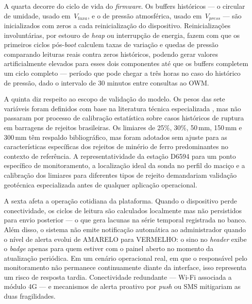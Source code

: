 A quarta decorre do ciclo de vida do \textit{firmware}. Os buffers
históricos --- o circular de umidade, usado em~$V_{taxa}$, e o de
pressão atmosférica, usado em~$V_{press}$ --- são inicializados com
zeros a cada reinicialização do dispositivo. Reinicializações
involuntárias, por estouro de \textit{heap} ou interrupção de energia,
fazem com que os primeiros ciclos pós-\textit{boot} calculem taxas de
variação e quedas de pressão comparando leituras reais contra zeros
históricos, podendo gerar valores artificialmente elevados para esses
dois componentes até que os buffers completem um ciclo completo ---
período que pode chegar a três horas no caso do histórico de pressão,
dado o intervalo de 30 minutos entre consultas ao OWM.

A quinta diz respeito ao escopo de validação do modelo. Os pesos das
sete variáveis foram definidos com base na literatura técnica
especializada \cite{rico2008mine, robertson2019feijaoson2019}, mas não
passaram por processo de calibração estatística sobre casos históricos
de ruptura em barragens de rejeitos brasileiras. Os limiares de 25\%,
30\%, 50\,mm, 150\,mm e 300\,mm têm respaldo bibliográfico, mas foram
adotados sem ajuste para as características específicas dos rejeitos de
minério de ferro predominantes no contexto de referência. A
representatividade da estação D6594 para um ponto específico de
monitoramento, a localização ideal da sonda no perfil do maciço e a
calibração dos limiares para diferentes tipos de rejeito demandariam
validação geotécnica especializada antes de qualquer aplicação
operacional.

A sexta afeta a operação cotidiana da plataforma. Quando o dispositivo
perde conectividade, os ciclos de leitura são calculados localmente mas
não persistidos para envio posterior --- o que gera lacunas na série
temporal registrada no banco. Além disso, o sistema não emite
notificação automática ao administrador quando o nível de alerta evolui
de AMARELO para VERMELHO: o sino no \textit{header} exibe o
\textit{badge} apenas para quem estiver com o painel aberto no momento
da atualização periódica. Em um cenário operacional real, em que o
responsável pelo monitoramento não permanece continuamente diante da
interface, isso representa um risco de resposta tardia. Conectividade
redundante --- Wi-Fi associada a módulo 4G --- e mecanismos de alerta
proativo por \textit{push} ou SMS mitigariam as duas fragilidades.
